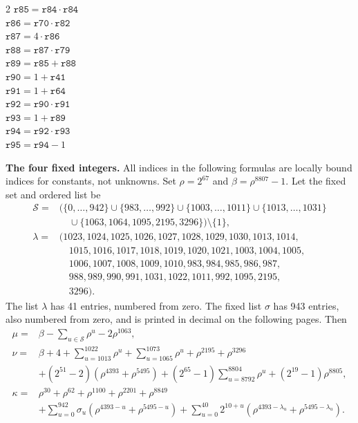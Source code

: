 \documentclass[10pt]{article}
\begin{document}
\begin{multicols}{2}
\(\mathtt{r85} = \mathtt{r84} \cdot \mathtt{r84}\)\\
\(\mathtt{r86} = \mathtt{r70} \cdot \mathtt{r82}\)\\
\(\mathtt{r87} = 4 \cdot \mathtt{r86}\)\\
\(\mathtt{r88} = \mathtt{r87} \cdot \mathtt{r79}\)\\
\(\mathtt{r89} = \mathtt{r85} + \mathtt{r88}\)\\
\(\mathtt{r90} = 1 + \mathtt{r41}\)\\
\(\mathtt{r91} = 1 + \mathtt{r64}\)\\
\(\mathtt{r92} = \mathtt{r90} \cdot \mathtt{r91}\)\\
\(\mathtt{r93} = 1 + \mathtt{r89}\)\\
\(\mathtt{r94} = \mathtt{r92} \cdot \mathtt{r93}\)\\
\(\mathtt{r95} = \mathtt{r94} - 1\)\\
\end{multicols}
\clearpage
\textbf{The four fixed integers.} All indices in the following formulas are
locally bound indices for constants, not unknowns. Set \(\rho=2^{67}\) and
\(\beta=\rho^{8807}-1\). Let the fixed set and ordered list be
\[
\begin{aligned}
\mathcal S={}&\bigl(\{0,\ldots,942\}\cup\{983,\ldots,992\}\cup
\{1003,\ldots,1011\}\cup\{1013,\ldots,1031\}\\
&\quad\cup\{1063,1064,1095,2195,3296\}\bigr)\setminus\{1\},\\
\lambda={}&(1023,1024,1025,1026,1027,1028,1029,1030,1013,1014,\\
&\quad 1015,1016,1017,1018,1019,1020,1021,1003,1004,1005,\\
&\quad 1006,1007,1008,1009,1010,983,984,985,986,987,\\
&\quad 988,989,990,991,1031,1022,1011,992,1095,2195,\\
&\quad 3296).
\end{aligned}
\]
The list \(\lambda\) has 41 entries, numbered from zero. The fixed list
\(\sigma\) has 943 entries, also numbered from zero, and is printed in
decimal on the following pages. Then
\[
\begin{aligned}
\mu={}&\beta-\sum_{u\in\mathcal S}\rho^u-2\rho^{1063},\\
\nu={}&\beta+4+\sum_{u=1013}^{1022}\rho^u+\sum_{u=1065}^{1073}\rho^u
 +\rho^{2195}+\rho^{3296}\\
&+(2^{51}-2)(\rho^{4393}+\rho^{5495})
 +(2^{65}-1)\sum_{u=8792}^{8804}\rho^u+(2^{19}-1)\rho^{8805},\\
\kappa={}&\rho^{30}+\rho^{62}+\rho^{1100}+\rho^{2201}+\rho^{8849}\\
&+\sum_{u=0}^{942}\sigma_u(\rho^{4393-u}+\rho^{5495-u})
 +\sum_{u=0}^{40}2^{10+u}(\rho^{4393-\lambda_u}+\rho^{5495-\lambda_u}).
\end{aligned}
\]
\end{document}
